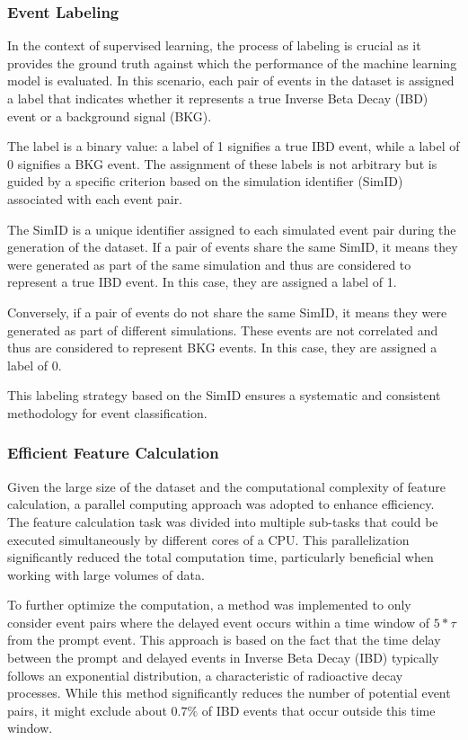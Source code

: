 \subsubsection*{Event Labeling}

In the context of supervised learning, the process of labeling is crucial as it provides the ground truth against which the performance of the machine learning model is evaluated. In this scenario, each pair of events in the dataset is assigned a label that indicates whether it represents a true Inverse Beta Decay (IBD) event or a background signal (BKG).

The label is a binary value: a label of 1 signifies a true IBD event, while a label of 0 signifies a BKG event. The assignment of these labels is not arbitrary but is guided by a specific criterion based on the simulation identifier (SimID) associated with each event pair.

The SimID is a unique identifier assigned to each simulated event pair during the generation of the dataset. If a pair of events share the same SimID, it means they were generated as part of the same simulation and thus are considered to represent a true IBD event. In this case, they are assigned a label of 1.

Conversely, if a pair of events do not share the same SimID, it means they were generated as part of different simulations. These events are not correlated and thus are considered to represent BKG events. In this case, they are assigned a label of 0.

This labeling strategy based on the SimID ensures a systematic and consistent methodology for event classification.


\subsubsection*{Efficient Feature Calculation}
Given the large size of the dataset and the computational complexity of feature calculation, a parallel computing approach was adopted to enhance efficiency. The feature calculation task was divided into multiple sub-tasks that could be executed simultaneously by different cores of a CPU. This parallelization significantly reduced the total computation time, particularly beneficial when working with large volumes of data.

To further optimize the computation, a method was implemented to only consider event pairs where the delayed event occurs within a time window of $5*\tau$ from the prompt event. This approach is based on the fact that the time delay between the prompt and delayed events in Inverse Beta Decay (IBD) typically follows an exponential distribution, a characteristic of radioactive decay processes. While this method significantly reduces the number of potential event pairs, it might exclude about $0.7\%$ of IBD events that occur outside this time window. 

